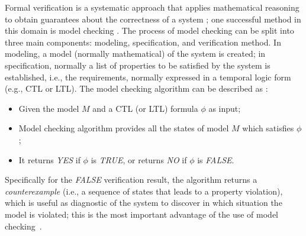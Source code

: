 \documentclass[journal]{IEEEtran}
\begin{document}
Formal verification is a systematic approach that applies mathematical reasoning to obtain guarantees about the correctness of a system \cite{Forejt2011}; one successful method in this domain is model checking \cite{Clarke2012}.
%
The process of model checking can be split into three main components: modeling, specification, and verification method. In modeling, a model (normally mathematical) of the system is created; in specification, normally a list of properties to be satisfied by the system is established, i.e., the requirements, normally  expressed in a temporal logic form (e.g., CTL or LTL).
%
%
The model checking algorithm can be described as \cite{ClarkeHV18}:  
%
\begin{itemize}
\item Given the model $M$ and a CTL (or LTL) formula $ \phi $ as input;  
\item Model checking algorithm provides all the states of model $ M $ which satisfies $ \phi $;  
\item It returns \textit{YES} if $ \phi $ is \textit{TRUE}, or returns \textit{NO} if $ \phi $ is \textit{FALSE}.  
\end{itemize}
Specifically for the \textit{FALSE} verification result, the algorithm returns a \textit{counterexample} (i.e., a sequence of states that leads to a property violation), which is useful as diagnostic of the system to discover in which situation the model is violated; this is the most important advantage of the use of model checking~\cite{ClarkeHV18}. 
\end{document}
